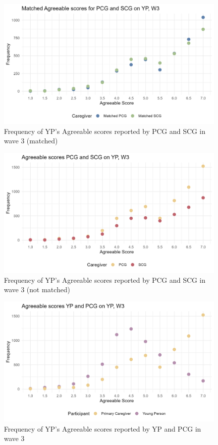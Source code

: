 \documentclass[a4paper]{article}
\begin{document}
\begin{figure}[htbp] 
    \centering
    \includegraphics[width=1\linewidth]{Matched Agreeable by participant w3.jpeg}
    \caption{Frequency of YP's Agreeable scores reported by PCG and SCG in wave 3 (matched)}
    \label{}
\end{figure}

\begin{figure}[htbp] 
    \centering
    \includegraphics[width=1\linewidth]{Frequency of Agreeable by participant w3.jpeg}
    \caption{Frequency of YP's Agreeable scores reported by PCG and SCG in wave 3 (not matched)}
    \label{}
\end{figure}

\begin{figure}[htbp] 
    \centering
    \includegraphics[width=1\linewidth]{Frequency of Agreeable by participant w3a.jpeg}
    \caption{Frequency of YP's Agreeable scores reported by YP and PCG in wave 3}
    \label{}
\end{figure}
\end{document}
